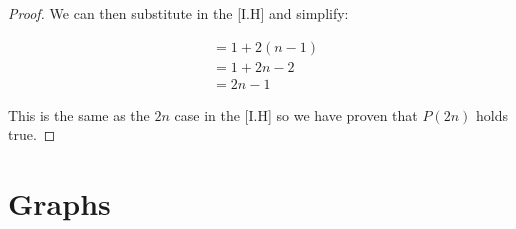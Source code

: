 \documentclass{article}
\begin{document}
\begin{enumerate}[label=(\alph*)]
\begin{proof}
            We can then substitute in the [I.H] and simplify:
            
            \begin{align*}
                &= 1 + 2(n-1) \\
                &= 1 + 2n - 2 \\
                &= 2n - 1
            \end{align*}
        
            This is the same as the \(2n\) case in the [I.H] so we have proven that \(P(2n)\) holds true.
        
        \end{proof}
    
\end{enumerate}

\section{Graphs}
\end{document}
